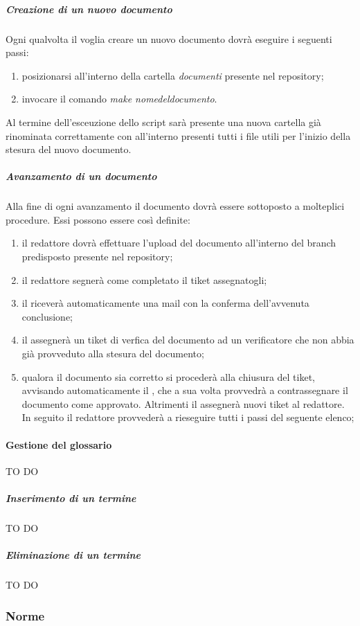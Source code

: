 				\subparagraph{Creazione di un nuovo documento}
				Ogni qualvolta il \roleProjectManager voglia creare un nuovo documento dovrà eseguire i seguenti passi:
				\begin{enumerate}
				\item posizionarsi all'interno della cartella \emph{documenti} presente nel repository;
				\item invocare il comando \emph{make nome\textunderscore del\textunderscore documento}.
				\end{enumerate}
				Al termine dell'esceuzione dello script sarà presente una nuova cartella già rinominata correttamente con all'interno presenti tutti i file utili per l'inizio della stesura del nuovo documento.

				\subparagraph{Avanzamento di un documento}
				Alla fine di ogni avanzamento il documento dovrà essere sottoposto a molteplici procedure. Essi possono essere così definite:
				\begin{enumerate}
				\item il redattore dovrà effettuare l'upload del documento all'interno del branch predisposto presente nel repository;
				\item il redattore segnerà come completato il tiket assegnatogli;
				\item il \roleProjectManager riceverà automaticamente una mail con la conferma dell'avvenuta conclusione;
				\item il \roleProjectManager assegnerà un tiket di verfica del documento ad un verificatore che non abbia già provveduto alla stesura del documento;
				\item qualora il documento sia corretto si procederà alla chiusura del tiket, avvisando automaticamente il \roleProjectManager, che a sua volta provvedrà a contrassegnare il documento come approvato. Altrimenti il \roleVerifier assegnerà nuovi tiket al redattore. In seguito il redattore provvederà a rieseguire tutti i passi del seguente elenco;
				\end{enumerate}

			\paragraph{Gestione del glossario} TO DO
				\subparagraph{Inserimento di un termine} TO DO
				\subparagraph{Eliminazione di un termine} TO DO

		\subsubsection{Norme}

